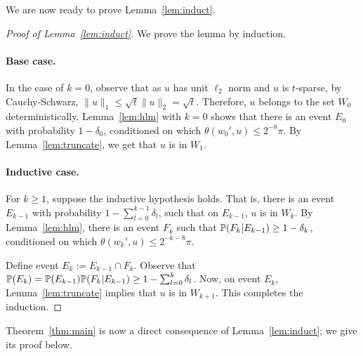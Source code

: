 
We are now ready to prove Lemma~\ref{lem:induct}.

\begin{proof}[Proof of Lemma~\ref{lem:induct}]
 We prove the lemma by induction.
\paragraph{Base case.} In the case of $k = 0$, observe that as $u$ has unit $\ell_2$ norm and $u$ is $t$-sparse, by Cauchy-Schwarz, $\| u \|_1 \leq \sqrt{t} \| u\|_2 = \sqrt{t}$. Therefore, $u$ belongs to the set $W_0$ deterministically.
Lemma~\ref{lem:hlm} with $k=0$ shows that there is an event $E_0$ with probability $1-\delta_0$, conditioned on which $\theta(w_0',u) \leq 2^{-8}\pi$. By Lemma~\ref{lem:truncate}, we get that $u$ is in $W_1$.

\paragraph{Inductive case.} For $k \geq 1$, suppose the inductive hypothesis holds. That is, there is an event $E_{k-1}$ with probability $1-\sum_{l=0}^{k-1} \delta_l$, such that
on $E_{k-1}$, $u$ is in $W_k$. By Lemma~\ref{lem:hlm}, there is an event $F_k$ such that $\P(F_k | E_{k-1}) \geq 1 - \delta_k$,
conditioned on which $\theta(w_k', u) \leq 2^{-k-8} \pi$.


Define event $E_k:= E_{k-1} \cap F_k$. Observe that $\P(E_k) = \P(E_{k-1})\P(F_k | E_{k-1}) \geq 1-\sum_{l=0}^{k} \delta_l$.
Now, on event $E_k$, Lemma~\ref{lem:truncate} implies that $u$ is in $W_{k+1}$.
This completes the induction.
\end{proof}

Theorem~\ref{thm:main} is now a direct consequence of Lemma~\ref{lem:induct}; we give its proof below.

